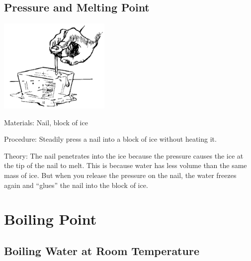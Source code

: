 \begin{multicols}{2}
\subsection{Pressure and Melting Point}

\begin{center}
\includegraphics[width=0.4\textwidth]{./img/source/pressure-melting-point.png}
\end{center}

\begin{description*}
\item[Materials:]{Nail, block of ice}
\item[Procedure:]{Steadily press a nail into a block of ice without heating it.}
\item[Theory:]{The nail penetrates into the ice because the pressure causes the ice at the tip of the nail to melt. This is because water has less volume than the same mass of ice. But when you release the pressure on the nail, the water freezes again and ``glues'' the nail into the block of ice.}
\end{description*}


\section*{Boiling Point}


\subsection{Boiling Water at Room Temperature}


\end{multicols}
